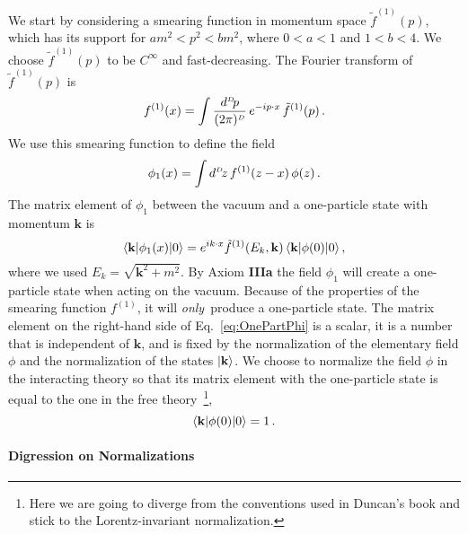 We start by considering a smearing function in momentum space
$\tilde{f}^{(1)}(p)$, which has its support for $am^2 < p^2 < bm^2$, where
$0<a<1$ and $1<b<4$. We choose $\tilde{f}^{(1)}(p)$ to be $C^\infty$ and
fast-decreasing. The Fourier transform of $\tilde{f}^{(1)}(p)$ is 
\begin{equation}
    \label{eq:FourierInvSmear}
    f^{(1)}(x) = \int \frac{d^{\scriptscriptstyle{D}}\!p}{(2\pi)^{\scriptscriptstyle{D}}}\, 
    e^{-ip\cdot x}\, \tilde{f}^{(1)}(p)\, .
\end{equation}
We use this smearing function to define the field 
\begin{equation}
    \label{eq:SmearedOnePart}
    \phi_1(x) = \int d^{\scriptscriptstyle{D}}\!z\, f^{(1)}(z-x)\, \phi(z)\, .
\end{equation}
The matrix element of $\phi_1$ between the vacuum and a one-particle state with 
momentum $\mathbf{k}$ is 
\begin{equation}
    \label{eq:OnePartPhi}
    \langle \mathbf{k} | \phi_1(x) | 0 \rangle = 
        e^{ik\cdot x} \tilde{f}^{(1)}(E_k,\mathbf{k})\, \langle \mathbf{k} | \phi(0) | 0 \rangle\, ,
\end{equation}
where we used $E_k=\sqrt{\mathbf{k}^2+m^2}$.
By Axiom {\bf IIIa} the field $\phi_1$ will create a one-particle state when acting on 
the vacuum. Because of the properties of the smearing function $f^{(1)}$, it will {\em only}\ 
produce a one-particle state. The matrix element on the right-hand side of Eq.~\eqref{eq:OnePartPhi} 
is a scalar, 
\ie it is a number that is independent of $\mathbf{k}$, and is fixed by the normalization of 
the elementary field $\phi$ and the normalization of the states $| \mathbf{k} \rangle$. We choose to 
normalize the field $\phi$ in the interacting theory so that its matrix element with the one-particle state
is equal to the one in the free theory~\footnote{Here we are going to diverge from the conventions
used in Duncan's book and stick to the Lorentz-invariant normalization.}, \ie
\begin{equation}
    \label{eq:InteractFieldNorm}
    \langle \mathbf{k} | \phi(0) | 0 \rangle = 1\, . 
\end{equation}

\paragraph{Digression on Normalizations}

